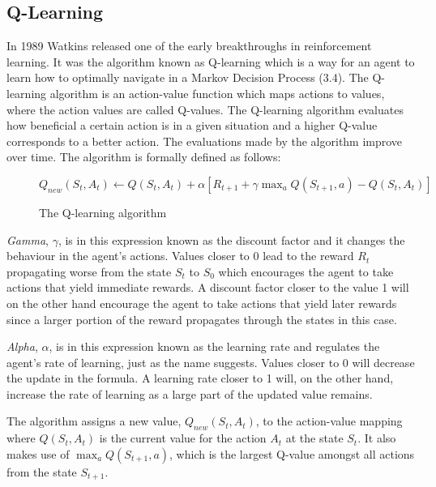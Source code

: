 \documentclass[titlepage]{article}
\begin{document}
\subsection{Q-Learning}

\vskip 0.2cm
In 1989 Watkins \cite{sutton} released one of the early breakthroughs in reinforcement learning. It was the algorithm known as Q-learning which is a way for an agent to learn how to optimally navigate in a Markov Decision Process (3.4). The Q-learning algorithm is an action-value function which maps actions to values, where the action values are called Q-values. The Q-learning algorithm evaluates how beneficial a certain action is in a given situation and a higher Q-value corresponds to a better action. The evaluations made by the algorithm improve over time. The algorithm \cite{sutton} is formally defined as follows:

\vskip 0.5cm

\begin{figure}[h]
    \centerline{$Q_{new}(S_{t}, A_{t}) \leftarrow Q(S_{t}, A_{t}) + \alpha[R_{t+1} + \gamma\max_{a}Q(S_{t+1}, a) - Q(S_{t}, A_{t})]$}
    \vskip 0.2cm
    \caption{The Q-learning algorithm}
\end{figure}

\vskip 0.3cm

\noindent
\emph{Gamma}, $\gamma$, is in this expression known as the discount factor and it changes the behaviour in the agent's actions. Values closer to 0 lead to the reward $R_{t}$ propagating worse from the state $S_{t}$ to $S_{0}$ which encourages the agent to take actions that yield immediate rewards. A discount factor closer to the value 1 will on the other hand encourage the agent to take actions that yield later rewards since a larger portion of the reward propagates through the states in this case. 

\vskip 0.3cm

\noindent
\emph{Alpha}, $\alpha$, is in this expression known as the learning rate and regulates the agent's rate of learning, just as the name suggests. Values closer to 0 will decrease the update in the formula. A learning rate closer to 1 will, on the other hand, increase the rate of learning as a large part of the updated value remains.

\vskip 0.3cm

\noindent
The algorithm assigns a new value, $Q_{new}(S_{t}, A_{t})$, to the action-value mapping where $Q(S_{t}, A_{t})$ is the current value for the action $A_{t}$ at the state $S_{t}$. It also makes use of $\max_{a}Q(S_{t+1}, a)$, which is the largest Q-value amongst all actions from the state $S_{t+1}$. 
\end{document}
